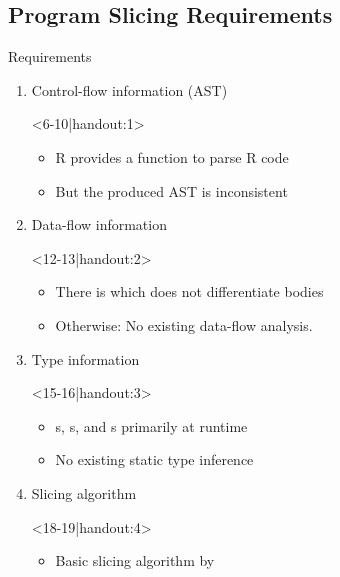 \def\After#1{\quad\textcolor{gray}{\scriptsize#1}}
\subsection{Program Slicing Requirements}
\begin{frame}[c]{Requirements}%
\vspace*{2mm}\begin{enumerate}
   \itemsep12pt
   \item<2-> Control-flow information (AST) \onslide<11-|handout:2->{\After{partially}}\begin{onlyenv}<6-10|handout:1>
         \begin{itemize}
         \item<6-> R provides a  function to parse R code
         \item<7-> But the produced AST is inconsistent
      \end{itemize}
   \end{onlyenv}
   \item<3-> Data-flow information \onslide<14-|handout:3->{\After{nothing}}\begin{onlyenv}<12-13|handout:2>
      \begin{itemize}
      \item<12-> There is \textsuperscript{\color{gray}\cite{lang_codedepends_2018}} which does not differentiate bodies
      \item<13-> Otherwise: No existing data-flow analysis.
   \end{itemize}
\end{onlyenv}
   \item<4-> Type information \onslide<17-|handout:4->{\After{nothing}}\begin{onlyenv}<15-16|handout:3>
      \begin{itemize}
      \item<15-> s, s, and s primarily at runtime
      \item<16-> No existing static type inference
   \end{itemize}
\end{onlyenv}
   \item<5-> Slicing algorithm \onslide<20-|handout:5->{\After{algorithm}}\begin{onlyenv}<18-19|handout:4>
      \begin{itemize}
      \item<18-> Basic slicing algorithm by \citeauthor{weiser_program_1984}\textsuperscript{\color{gray}\cite{weiser_program_1984}}%

\end{itemize}
\end{onlyenv}
\end{enumerate}
\end{frame}

